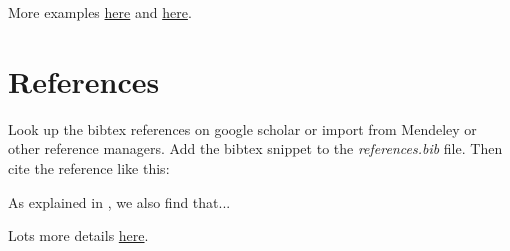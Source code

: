More examples \href{https://www.latex-tutorial.com/tutorials/amsmath/}{here} and \href{https://www.overleaf.com/learn/latex/Mathematical_expressions}{here}.



\section{References}
Look up the bibtex references on google scholar or import from Mendeley or other reference managers. Add the bibtex snippet to the \emph{references.bib} file. Then cite the reference like this:

As explained in \cite{knuth2014art}, we also find that...

Lots more details \href{https://www.latex-tutorial.com/tutorials/bibtex/}{here}.
